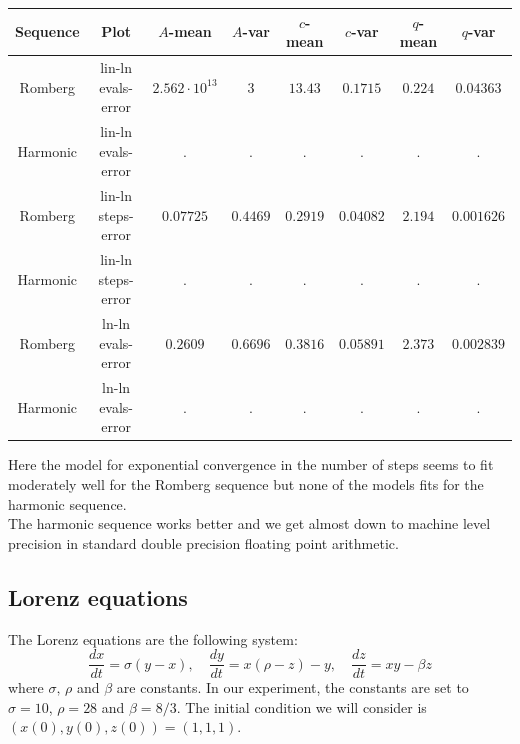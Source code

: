 \begin{table}[H]
    \centering
    \small
     \begin{tabular}{c|c||c|c|c|c|c|c}
Sequence & Plot & \(A\)-mean & \(A\)-var & \(c\)-mean & \(c\)-var & \(q\)-mean & \(q\)-var\\\hline
Romberg & lin-ln evals-error & \(2.562\cdot 10^{13}\) & \(3\) & \(13.43\) & \(0.1715\) & \(0.224\) & \(0.04363\) \\
Harmonic & lin-ln evals-error & . & . & . & . & . & . \\
Romberg & lin-ln steps-error & \(0.07725\) & \(0.4469\) & \(0.2919\) & \(0.04082\) & \(2.194\) & \(0.001626\) \\
Harmonic & lin-ln steps-error & . & . & . & . & . & . \\
Romberg & ln-ln evals-error & \(0.2609\) & \(0.6696\) & \(0.3816\) & \(0.05891\) & \(2.373\) & \(0.002839\) \\
Harmonic & ln-ln evals-error & . & . & . & . & . & . \\
    \end{tabular}
    \label{tab:my_label}
\end{table}

Here the model for exponential convergence in the number of steps seems to fit moderately well for the Romberg sequence but none of the models fits for the harmonic sequence.\\

The harmonic sequence works better and we get almost down to machine level precision in standard double precision floating point arithmetic.

\subsection{Lorenz equations}

The Lorenz equations are the following system: 
\[
\frac{dx}{dt} = \sigma (y-x),\quad \frac{dy}{dt} = x(\rho - z) - y,\quad \frac{dz}{dt} = xy - \beta z
\]
where \(\sigma,\,\rho\) and \(\beta\) are constants. In our experiment, the constants are set to \(\sigma = 10\), \(\rho = 28\) and \(\beta = 8/3\). The initial condition we will consider is \((x(0),y(0),z(0)) = (1,1,1)\).\\

